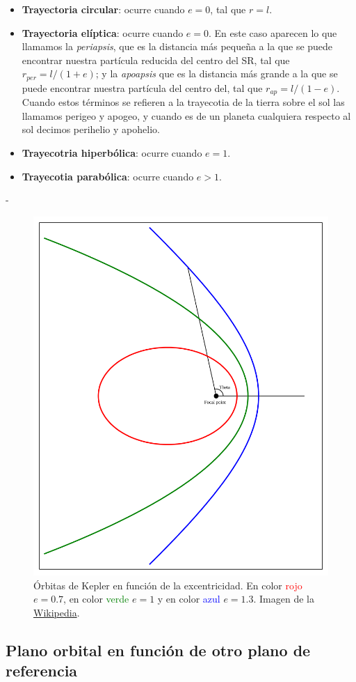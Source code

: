 \begin{itemize}
	\item \textbf{Trayectoria circular}: ocurre cuando $e=0$, tal que $r=l$.
	\item \textbf{Trayectoria elíptica}: ocurre cuando $e=0$. En este caso aparecen lo que llamamos la \textit{periapsis}, que es la distancia más pequeña a la que se puede encontrar nuestra partícula reducida del centro del SR, tal que $r_{per}=l/(1+e)$; y la \textit{apoapsis} que es la distancia más grande a la que se puede encontrar nuestra partícula del centro del, tal que $r_{ap}=l/(1-e)$. Cuando estos términos se refieren a la trayecotia de la tierra sobre el sol las llamamos perigeo y apogeo, y cuando es de un planeta cualquiera respecto al sol decimos perihelio y apohelio.
	\item \textbf{Trayecotria hiperbólica}: ocurre cuando $e=1$.
	\item \textbf{Trayecotia parabólica}: ocurre cuando $e>1$.
\end{itemize}
-
\begin{figure}[h!] \centering
	\includegraphics[width=0.5\linewidth]{Cuerpo/Ch_02/02_Kepler_Orbits.png}
	\caption{Órbitas de Kepler en función de la excentricidad. En color \textcolor{red}{rojo} $e=0.7$, en color \textcolor{green}{verde} $e=1$ y en color \textcolor{blue}{azul} $e=1.3$. Imagen de la \href{https://es.wikipedia.org/wiki/Excentricidad_orbital}{Wikipedia}.}
\end{figure}

\subsection{Plano orbital en función de otro plano de referencia}

